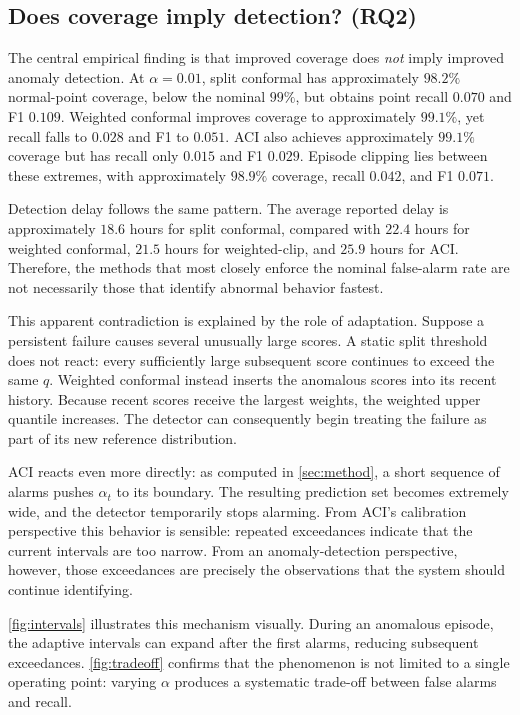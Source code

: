 \documentclass[11pt]{article}
\theoremstyle{definition}
\theoremstyle{remark}
\begin{document}
\subsection{Does coverage imply detection? (RQ2)}

The central empirical finding is that improved coverage does \emph{not} imply improved anomaly detection. At $\alpha = 0.01$, split conformal has approximately $98.2\%$ normal-point coverage, below the nominal $99\%$, but obtains point recall $0.070$ and F1 $0.109$. Weighted conformal improves coverage to approximately $99.1\%$, yet recall falls to $0.028$ and F1 to $0.051$. ACI also achieves approximately $99.1\%$ coverage but has recall only $0.015$ and F1 $0.029$. Episode clipping lies between these extremes, with approximately $98.9\%$ coverage, recall $0.042$, and F1 $0.071$.

Detection delay follows the same pattern. The average reported delay is approximately $18.6$ hours for split conformal, compared with $22.4$ hours for weighted conformal, $21.5$ hours for weighted-clip, and $25.9$ hours for ACI. Therefore, the methods that most closely enforce the nominal false-alarm rate are not necessarily those that identify abnormal behavior fastest.

This apparent contradiction is explained by the role of adaptation. Suppose a persistent failure causes several unusually large scores. A static split threshold does not react: every sufficiently large subsequent score continues to exceed the same $q$. Weighted conformal instead inserts the anomalous scores into its recent history. Because recent scores receive the largest weights, the weighted upper quantile increases. The detector can consequently begin treating the failure as part of its new reference distribution.

ACI reacts even more directly: as computed in \cref{sec:method}, a short sequence of alarms pushes $\alpha_t$ to its boundary. The resulting prediction set becomes extremely wide, and the detector temporarily stops alarming. From ACI's calibration perspective this behavior is sensible: repeated exceedances indicate that the current intervals are too narrow. From an anomaly-detection perspective, however, those exceedances are precisely the observations that the system should continue identifying.

\cref{fig:intervals} illustrates this mechanism visually. During an anomalous episode, the adaptive intervals can expand after the first alarms, reducing subsequent exceedances. \cref{fig:tradeoff} confirms that the phenomenon is not limited to a single operating point: varying $\alpha$ produces a systematic trade-off between false alarms and recall.
\end{document}
